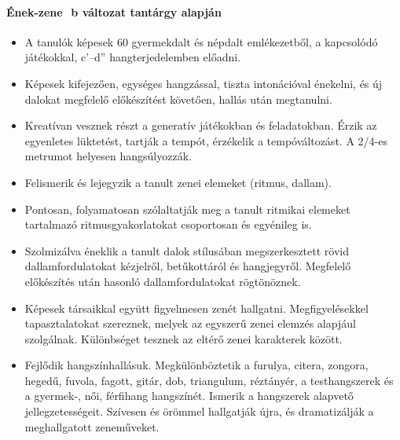 \paragraph{Ének-zene
﻿  b változat tantárgy alapján}
\begin{itemize}
\item A tanulók képesek 60 gyermekdalt és népdalt emlékezetből, a kapcsolódó játékokkal, c’–d” hangterjedelemben előadni.
\item Képesek kifejezően, egységes hangzással, tiszta intonációval énekelni, és új dalokat megfelelő előkészítést követően, hallás után megtanulni.
\item Kreatívan vesznek részt a generatív játékokban és feladatokban. Érzik az egyenletes lüktetést, tartják a tempót, érzékelik a tempóváltozást. A 2/4-es metrumot helyesen hangsúlyozzák.
\item Felismerik és lejegyzik a tanult zenei elemeket (ritmus, dallam).
\item Pontosan, folyamatosan szólaltatják meg a tanult ritmikai elemeket tartalmazó ritmusgyakorlatokat csoportosan és egyénileg is.
\item Szolmizálva éneklik a tanult dalok stílusában megszerkesztett rövid dallamfordulatokat kézjelről, betűkottáról és hangjegyről. Megfelelő előkészítés után hasonló dallamfordulatokat rögtönöznek.
\item Képesek társaikkal együtt figyelmesen zenét hallgatni. Megfigyelésekkel tapasztalatokat szereznek, melyek az egyszerű zenei elemzés alapjául szolgálnak. Különbséget tesznek az eltérő zenei karakterek között.
\item Fejlődik hangszínhallásuk. Megkülönböztetik a furulya, citera, zongora, hegedű, fuvola, fagott, gitár, dob, triangulum, réztányér, a testhangszerek és a gyermek-, női, férfihang hangszínét. Ismerik a hangszerek alapvető jellegzetességeit. Szívesen és örömmel hallgatják újra, és dramatizálják a meghallgatott zeneműveket.
\end{itemize}
